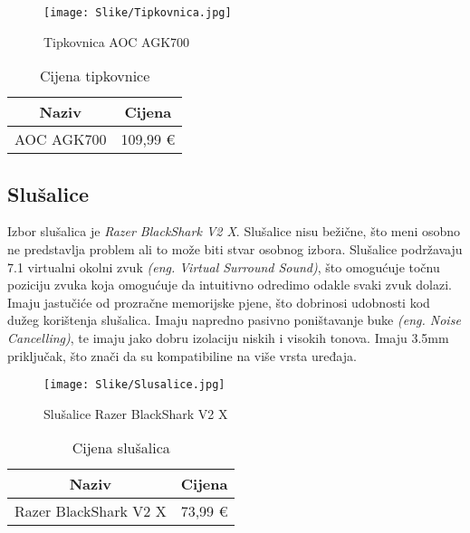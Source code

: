 \documentclass[14pt]{article}
\begin{document}
    \begin{figure}[H]
        \centering
        \texttt{[image: Slike/Tipkovnica.jpg]}
        \caption{Tipkovnica AOC AGK700}
        \label{fig:Tipkovnica}
    \end{figure}

    \begin{table}[H]
        \centering
        \begin{tabular}{|c|c|}
            \hline
            Naziv & Cijena \\
            \hline
            AOC AGK700 & 109,99 € \\
            \hline
        \end{tabular}
        \caption{Cijena tipkovnice}
        \label{tab:Tipkovnica}
    \end{table}

    \clearpage
    \subsection{Slušalice}
    Izbor slušalica je \textit{Razer BlackShark V2 X}. Slušalice nisu bežične, što meni osobno ne predstavlja problem ali to može biti stvar osobnog izbora. Slušalice podržavaju 7.1 virtualni okolni zvuk \emph{(eng. Virtual Surround Sound)}, što omogućuje točnu poziciju zvuka koja omogućuje da intuitivno odredimo odakle svaki zvuk dolazi. Imaju jastučiće od prozračne memorijske pjene, što dobrinosi udobnosti kod dužeg korištenja slušalica. Imaju napredno pasivno poništavanje buke \emph{(eng. Noise Cancelling)}, te imaju jako dobru izolaciju niskih i visokih tonova. Imaju 3.5mm priključak, što znači da su kompatibiline na više vrsta uređaja.

    \begin{figure}[H]
        \centering
        \texttt{[image: Slike/Slusalice.jpg]}
        \caption{Slušalice Razer BlackShark V2 X}
        \label{fig:Slusalice}
    \end{figure}

    \begin{table}[H]
        \centering
        \begin{tabular}{|c|c|}
            \hline
            Naziv & Cijena \\
            \hline
            Razer BlackShark V2 X & 73,99 € \\
            \hline
        \end{tabular}
        \caption{Cijena slušalica}
        \label{tab:Slusalice}
    \end{table}
\end{document}
